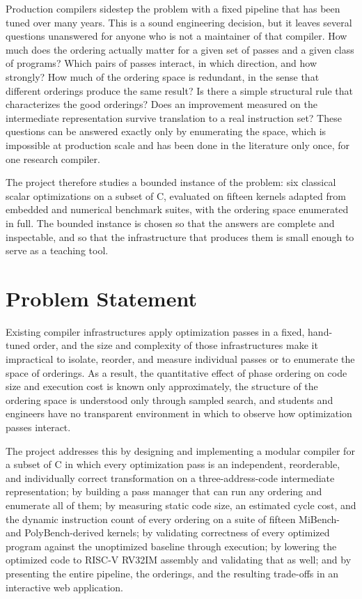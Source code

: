 Production compilers sidestep the problem with a fixed pipeline that has been tuned over many years. This is a sound engineering decision, but it leaves several questions unanswered for anyone who is not a maintainer of that compiler. How much does the ordering actually matter for a given set of passes and a given class of programs? Which pairs of passes interact, in which direction, and how strongly? How much of the ordering space is redundant, in the sense that different orderings produce the same result? Is there a simple structural rule that characterizes the good orderings? Does an improvement measured on the intermediate representation survive translation to a real instruction set? These questions can be answered exactly only by enumerating the space, which is impossible at production scale and has been done in the literature only once, for one research compiler.

The project therefore studies a bounded instance of the problem: six classical scalar optimizations on a subset of C, evaluated on fifteen kernels adapted from embedded and numerical benchmark suites, with the ordering space enumerated in full. The bounded instance is chosen so that the answers are complete and inspectable, and so that the infrastructure that produces them is small enough to serve as a teaching tool.

\section{Problem Statement}

Existing compiler infrastructures apply optimization passes in a fixed, hand-tuned order, and the size and complexity of those infrastructures make it impractical to isolate, reorder, and measure individual passes or to enumerate the space of orderings. As a result, the quantitative effect of phase ordering on code size and execution cost is known only approximately, the structure of the ordering space is understood only through sampled search, and students and engineers have no transparent environment in which to observe how optimization passes interact.

The project addresses this by designing and implementing a modular compiler for a subset of C in which every optimization pass is an independent, reorderable, and individually correct transformation on a three-address-code intermediate representation; by building a pass manager that can run any ordering and enumerate all of them; by measuring static code size, an estimated cycle cost, and the dynamic instruction count of every ordering on a suite of fifteen MiBench- and PolyBench-derived kernels; by validating correctness of every optimized program against the unoptimized baseline through execution; by lowering the optimized code to RISC-V RV32IM assembly and validating that as well; and by presenting the entire pipeline, the orderings, and the resulting trade-offs in an interactive web application.

